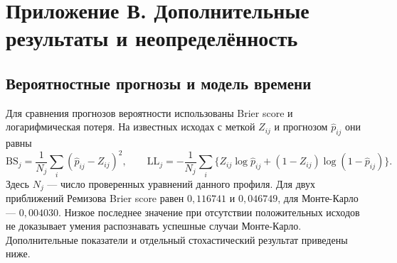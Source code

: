 \renewcommand{\theHequation}{C.\arabic{equation}}\renewcommand{\theHfigure}{C.\arabic{figure}}\renewcommand{\theHtable}{C.\arabic{table}}
\section*{Приложение В. Дополнительные результаты и неопределённость}\label{app:c}
\renewcommand{\thefigure}{В.\arabic{figure}}\setcounter{figure}{0}
\renewcommand{\thetable}{В.\arabic{table}}\setcounter{table}{0}
\renewcommand{\theequation}{В.\arabic{equation}}\setcounter{equation}{0}
\subsection*{Вероятностные прогнозы и модель времени}
Для сравнения прогнозов вероятности использованы Brier score и логарифмическая потеря. На известных исходах с меткой $Z_{ij}$ и прогнозом $\widehat p_{ij}$ они равны
\begin{equation}\label{eq:scores}
\mathrm{BS}_j=\frac1{N_j}\sum_i(\widehat p_{ij}-Z_{ij})^2,\qquad
\mathrm{LL}_j=-\frac1{N_j}\sum_i\{Z_{ij}\log\widehat p_{ij}+(1-Z_{ij})\log(1-\widehat p_{ij})\}.
\end{equation}
Здесь $N_j$ --- число проверенных уравнений данного профиля. Для двух приближений Ремизова Brier score равен $0{,}116741$ и $0{,}046749$, для Монте-Карло --- $0{,}004030$. Низкое последнее значение при отсутствии положительных исходов не доказывает умения распознавать успешные случаи Монте-Карло. Дополнительные показатели и отдельный стохастический результат приведены ниже.


